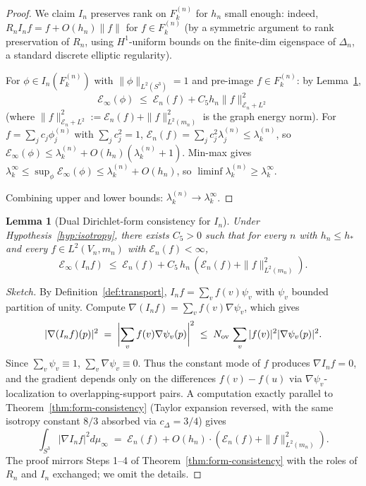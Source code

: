 \documentclass[11pt, a4paper]{amsart}
\newtheorem{lemma}[theorem]{Lemma}
\theoremstyle{definition}
\begin{document}
\begin{proof}
We claim $I_n$ preserves rank on $F_k^{(n)}$ for $h_n$ small
enough: indeed, $R_n I_n f = f + O(h_n)\|f\|$ for $f \in F_k^{(n)}$
(by a symmetric argument to rank preservation of $R_n$, using
$H^1$-uniform bounds on the finite-dim eigenspace of $\Delta_n$,
a standard discrete elliptic regularity).

For $\phi \in I_n(F_k^{(n)})$ with $\|\phi\|_{L^2(S^3)} = 1$ and
pre-image $f \in F_k^{(n)}$: by
Lemma~\ref{lem:dual-form-consistency},
\[
  \mathcal E_\infty(\phi) \;\leq\; \mathcal E_n(f) + C_5 h_n
    \|f\|^2_{\mathcal E_n + L^2}
\]
(where $\|f\|^2_{\mathcal E_n + L^2} := \mathcal E_n(f) +
\|f\|_{L^2(m_n)}^2$ is the graph energy norm). For
$f = \sum_j c_j \phi_j^{(n)}$ with $\sum_j c_j^2 = 1$,
$\mathcal E_n(f) = \sum_j c_j^2 \lambda_j^{(n)} \leq
\lambda_k^{(n)}$, so $\mathcal E_\infty(\phi) \leq \lambda_k^{(n)}
+ O(h_n)(\lambda_k^{(n)} + 1)$. Min-max gives $\lambda_k^\infty
\leq \sup_\phi \mathcal E_\infty(\phi) \leq \lambda_k^{(n)} +
O(h_n)$, so $\liminf \lambda_k^{(n)} \geq \lambda_k^\infty$.

Combining upper and lower bounds: $\lambda_k^{(n)} \to
\lambda_k^\infty$.
\end{proof}

\begin{lemma}[Dual Dirichlet-form consistency for $I_n$]
\label{lem:dual-form-consistency}
Under Hypothesis~\ref{hyp:isotropy}, there exists $C_5 > 0$
such that for every $n$ with $h_n \leq h_\ast$ and every
$f \in L^2(V_n, m_n)$ with $\mathcal E_n(f) < \infty$,
\[
  \mathcal E_\infty(I_n f) \;\leq\; \mathcal E_n(f) +
    C_5\,h_n\,(\mathcal E_n(f) + \|f\|_{L^2(m_n)}^2).
\]
\end{lemma}

\begin{proof}[Sketch]
By Definition~\ref{def:transport}, $I_n f = \sum_v f(v) \psi_v$
with $\psi_v$ bounded partition of unity. Compute
$\nabla(I_n f) = \sum_v f(v) \nabla \psi_v$, which gives
\[
  |\nabla (I_n f)(p)|^2 \;=\;
    \biggl|\sum_v f(v) \nabla \psi_v(p)\biggr|^2
    \;\leq\; N_{\rm ov}\,\sum_v |f(v)|^2 |\nabla \psi_v(p)|^2.
\]
Since $\sum_v \psi_v \equiv 1$, $\sum_v \nabla \psi_v \equiv 0$.
Thus the constant mode of $f$ produces $\nabla I_n f = 0$, and
the gradient depends only on the differences $f(v) - f(u)$ via
$\nabla \psi_v$-localization to overlapping-support pairs. A
computation exactly parallel to Theorem~\ref{thm:form-consistency}
(Taylor expansion reversed, with the same isotropy constant
$8/3$ absorbed via $c_\Delta = 3/4$) gives
\[
  \int_{S^3} |\nabla I_n f|^2 d\mu_\infty \;=\; \mathcal E_n(f)
    + O(h_n)\cdot(\mathcal E_n(f) + \|f\|^2_{L^2(m_n)}).
\]
The proof mirrors Steps 1--4 of
Theorem~\ref{thm:form-consistency} with the roles of $R_n$
and $I_n$ exchanged; we omit the details.
\end{proof}
\end{document}
